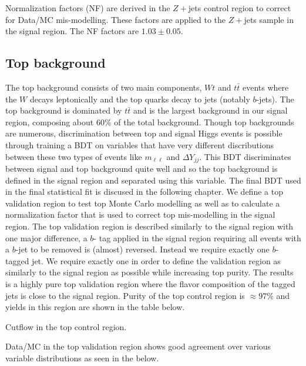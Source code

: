 Normalization factors (NF) are derived in the $Z+$jets control region to correct for Data/MC mis-modelling. These factors are applied to the $Z+$jets sample in the signal region. The NF factors are $1.03 \pm 0.05$. 

\subsection{Top background}
The top background consists of two main components, $Wt$ and $t\bar{t}$ events where the $W$ decays leptonically and the top quarks decay to jets (notably $b$-jets). The top background is dominated by $t\bar{t}$ and is the largest background in our signal region, composing about $60\%$ of the total background. Though top backgrounds are numerous, discrimination between top and signal Higgs events is possible through training a BDT on variables that have very different discributions between these two types of events like $m_{\ell\ell}$ and $\Delta Y_{jj}$. This BDT discriminates between signal and top background quite well and so the top background is defined in the signal region and separated using this variable. The final BDT used in the final statistical fit is discused in the following chapter. We define a top validation region to test top Monte Carlo modelling as well as to calculate a normalization factor that is used to correct top mis-modelling in the signal region. The top validation region is described similarly to the signal region with one major difference, a $b$- tag applied in the signal region requiring all events with a $b$-jet to be removed is (almost) reversed. Instead we require exactly one $b$-tagged jet. We require exactly one in order to define the validation region as similarly to the signal region as possible while increasing top purity. The results is a highly pure top validation region where the flavor composition of the tagged jets is close to the signal region. Purity of the top control region is $\approx 97\%$ and yields in this region are shown in the table below.

\begin{table}[h!]
\scalebox{0.4}{

}
\caption{Cutflow in the top control region.}
\label{tab:topcr}
\end{table}

Data/MC in the top validation region shows good agreement over various variable distributions as seen in the  below. 

